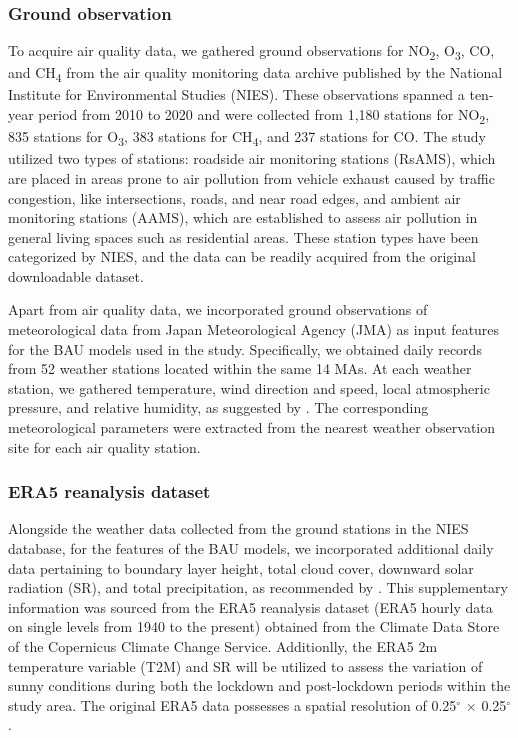 \subsubsection{Ground observation}
To acquire air quality data, we gathered ground observations for NO\textsubscript{2}, O\textsubscript{3}, CO, and CH\textsubscript{4} from the air quality monitoring data archive published by the National Institute for Environmental Studies (NIES). These observations spanned a ten-year period from 2010 to 2020 and were collected from 1,180 stations for NO\textsubscript{2}, 835 stations for O\textsubscript{3}, 383 stations for CH\textsubscript{4}, and 237 stations for CO. The study utilized two types of stations: roadside air monitoring stations (RsAMS), which are placed in areas prone to air pollution from vehicle exhaust caused by traffic congestion, like intersections, roads, and near road edges, and ambient air monitoring stations (AAMS), which are established to assess air pollution in general living spaces such as residential areas. These station types have been categorized by NIES, and the data can be readily acquired from the original downloadable dataset. \par
Apart from air quality data, we incorporated ground observations of meteorological data from Japan Meteorological Agency (JMA) as input features for the BAU models used in the study. Specifically, we obtained daily records from 52 weather stations located within the same 14 MAs. At each weather station, we gathered temperature, wind direction and speed, local atmospheric pressure, and relative humidity, as suggested by \citep{grange2021covid}. The corresponding meteorological parameters were extracted from the nearest weather observation site for each air quality station.\par

\subsubsection{ERA5 reanalysis dataset}
Alongside the weather data collected from the ground stations in the NIES database, for the features of the BAU models, we incorporated additional daily data pertaining to boundary layer height, total cloud cover, downward solar radiation (SR), and total precipitation, as recommended by \citep{shi2021abrupt}. This supplementary information was sourced from the ERA5 reanalysis dataset (ERA5 hourly data on single levels from 1940 to the present) obtained from the Climate Data Store of the Copernicus Climate Change Service. Additionlly, the ERA5 2m temperature variable (T2M) and SR will be utilized to assess the variation of sunny conditions during both the lockdown and post-lockdown periods within the study area. The original ERA5 data possesses a spatial resolution of 0.25$^{\circ}$ $\times$ 0.25$^{\circ}$ .\par
